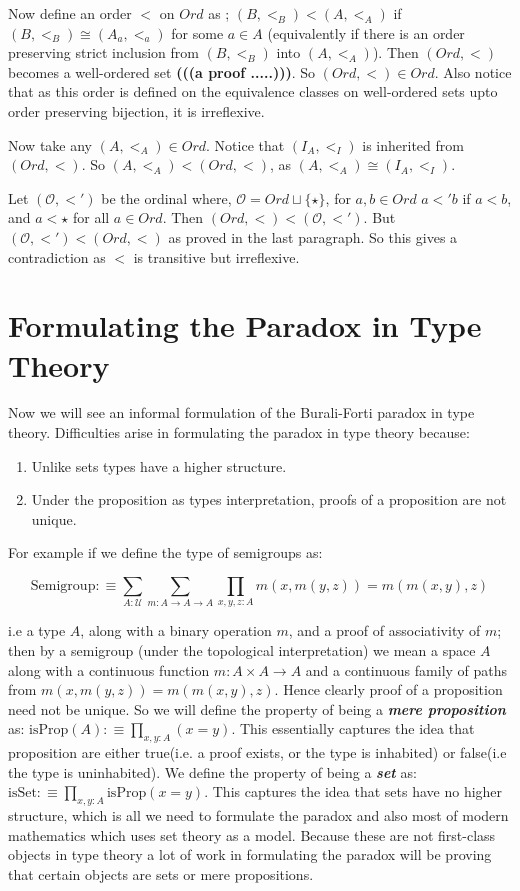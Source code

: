 \documentclass[10pt]{article}
\theoremstyle{definition}
\theoremstyle{plain}
\theoremstyle{remark}
\newcommand{\U}{\mathscr{U}}
\begin{document}
Now define an order $<$ on $Ord$ as ; $(B,<_B) < (A, <_A)$ if $(B, <_B) \cong (A_a, <_a)$ 
for some $a \in A$ (equivalently if there is an order preserving strict inclusion 
from $(B,<_B)$ into $(A,<_A)$). Then $(Ord, <)$ becomes a well-ordered set 
\textbf{(((a proof .....)))}. So $(Ord, <) \in Ord$. Also notice that as this order is defined 
on the equivalence classes on well-ordered sets upto order preserving bijection, it is 
irreflexive.\smallskip

Now take any $(A, <_A)\in Ord$. Notice that $(I_A, <_I)$ is inherited from ${(Ord, <)}$. So
$(A, <_A) < (Ord, <)$, as $(A,<_A) \cong (I_A, <_I)$.\smallskip

Let $(\mathcal{O}, <')$ be the ordinal where, $\mathcal{O} = Ord\sqcup \{\star\}$, for 
$a,b\in Ord$ $a<'b$ if $a<b$, and $a<\star$ for all $a\in Ord$. Then 
$(Ord,<)< (\mathcal{O},<')$. But $(\mathcal{O},<')<(Ord,<)$ as proved in the last paragraph.
So this gives a contradiction as $<$ is transitive but irreflexive. 

\section{Formulating the Paradox in Type Theory}\label{S:Form in TT}

Now we will see an informal formulation of the Burali-Forti paradox in type theory. 
Difficulties arise in formulating the paradox in type theory because:
\begin{enumerate}
\item Unlike sets types have a higher structure.
\item Under the proposition as types interpretation, proofs of a proposition are not unique.
\end{enumerate}

For example if we define the type of semigroups as:

\[ \text{Semigroup}:\equiv 	\sum_{A : \U} \sum_{m : A \to A \to A} 
    \prod_{x,y,z:A} m(x,m(y,z)) = m(m(x,y),z) \]
    
i.e a type $A$, along with a binary operation $m$, and a proof of associativity of $m$; then
by a semigroup (under the topological interpretation) we mean a space $A$ along with a
continuous function $m : A\times A \to A$ and a continuous family of paths from 
$m(x,m(y,z)) = m(m(x,y),z)$. Hence clearly proof of a proposition need not be unique. So
we will define the property of being a \textbf{\textit{mere proposition}} as:
${ \text{isProp}(A) :\equiv \prod_{x,y : A} (x = y) }$. This essentially captures the idea
that proposition are either true(i.e. a proof exists, or the type is inhabited) or false(i.e
the type is uninhabited). We define the property of being a \textbf{\textit{set}} as: 
${ \text{isSet} :\equiv \prod_{x,y:A} \text{isProp}(x=y)  }$. This captures the idea that sets
have no higher structure, which is all we need to formulate the paradox and also most of
modern mathematics which uses set theory as a model. Because these are not first-class 
objects in type theory a lot of work in formulating the paradox will be proving that certain
objects are sets or mere propositions.\smallskip
\end{document}
